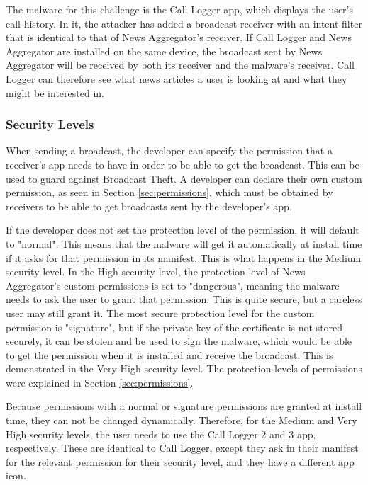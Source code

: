     The malware for this challenge is the Call Logger app, which displays the user's call history. In it, the attacker has added a broadcast receiver with an intent filter that is identical to that of News Aggregator's receiver. If Call Logger and News Aggregator are installed on the same device, the broadcast sent by News Aggregator will be received by both its receiver and the malware's receiver. Call Logger can therefore see what news articles a user is looking at and what they might be interested in.
    
    \subsubsection{Security Levels}
        \label{subsubsec:broadcast_theft_security_levels}
    
    When sending a broadcast, the developer can specify the permission that a receiver's app needs to have in order to be able to get the broadcast. This can be used to guard against Broadcast Theft. A developer can declare their own custom permission, as seen in Section \ref{sec:permissions}, which must be obtained by receivers to be able to get broadcasts sent by the developer's app. 
    
    If the developer does not set the protection level of the permission, it will default to "normal". This means that the malware will get it automatically at install time if it asks for that permission in its manifest. This is what happens in the Medium security level. In the High security level, the protection level of News Aggregator's custom permissions is set to "dangerous", meaning the malware needs to ask the user to grant that permission. This is quite secure, but a careless user may still grant it. The most secure protection level for the custom permission is "signature", but if the private key of the certificate is not stored securely, it can be stolen and be used to sign the malware, which would be able to get the permission when it is installed and receive the broadcast. This is demonstrated in the Very High security level. The protection levels of permissions were explained in Section \ref{sec:permissions}.
    
    Because permissions with a normal or signature permissions are granted at install time, they can not be changed dynamically. Therefore, for the Medium and Very High security levels, the user needs to use the Call Logger 2 and 3 app, respectively. These are identical to Call Logger, except they ask in their manifest for the relevant permission for their security level, and they have a different app icon.
    
